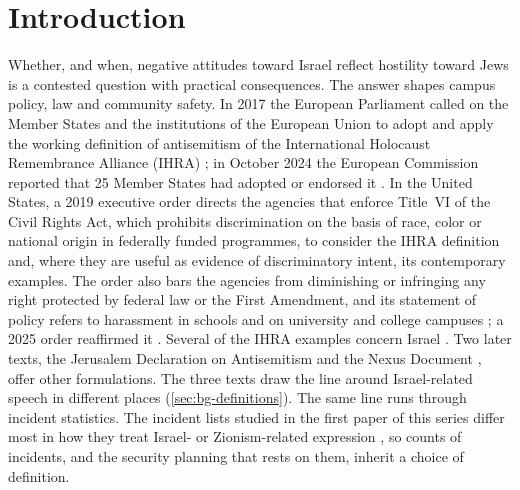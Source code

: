 \section{Introduction}\label{sec:intro}

Whether, and when, negative attitudes toward Israel reflect hostility
toward Jews is a contested question with practical consequences. The
answer shapes campus policy, law and community
safety. In 2017 the European Parliament called on the Member States and the
institutions of the European Union to adopt and apply the working definition
of antisemitism of the International Holocaust Remembrance Alliance (IHRA)
\citep{ep2017antisemitism}; in October 2024 the European Commission reported
that 25 Member States had adopted or endorsed it \citep{ec2024antisemitism}.
In the United States, a 2019 executive order directs the agencies that
enforce Title~VI of the Civil Rights Act, which prohibits discrimination on
the basis of race, color or national origin in federally funded programmes,
to consider the IHRA definition and, where they are useful as evidence of
discriminatory intent, its contemporary examples. The order also bars the
agencies from diminishing or infringing any right protected by federal law
or the First Amendment, and its statement of policy refers to harassment in
schools and on university and college campuses \citep{eo13899}; a 2025 order
reaffirmed it \citep{eo14188}. Several of the IHRA examples concern Israel
\citep{ihra2016}. Two later texts, the Jerusalem Declaration on
Antisemitism \citep{jda2021} and the Nexus Document \citep{nexus2021},
offer other formulations. The three texts draw the line around
Israel-related speech in different places (\cref{sec:bg-definitions}). The
same line runs through incident statistics. The incident lists studied in
the first paper of this series differ most in how they treat Israel- or
Zionism-related expression \citep{kornsteinlab2026p1darkfigure}, so counts of
incidents, and the security planning that rests on them, inherit a choice of
definition.

